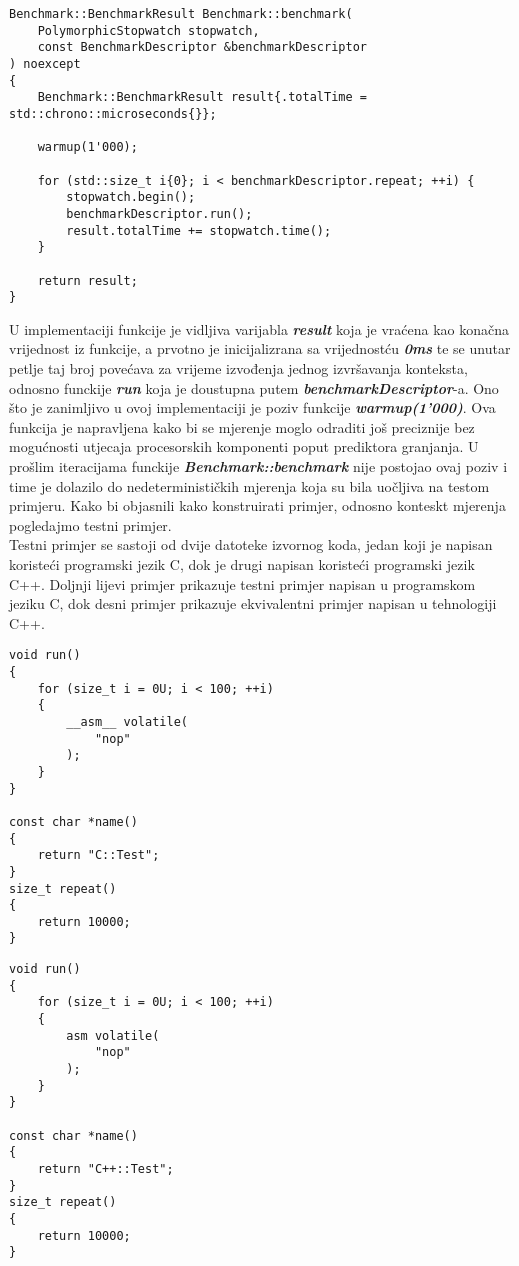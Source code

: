 \lstset{language=C++, tabsize=2, frame=single, breaklines=true, showstringspaces=false}
\begin{lstlisting}
Benchmark::BenchmarkResult Benchmark::benchmark(
    PolymorphicStopwatch stopwatch, 
    const BenchmarkDescriptor &benchmarkDescriptor
) noexcept 
{
    Benchmark::BenchmarkResult result{.totalTime = std::chrono::microseconds{}};

    warmup(1'000);

    for (std::size_t i{0}; i < benchmarkDescriptor.repeat; ++i) {
        stopwatch.begin();
        benchmarkDescriptor.run();
        result.totalTime += stopwatch.time();
    }

    return result;
}
\end{lstlisting}
U implementaciji funkcije je vidljiva varijabla \textbf{\textit{result}} koja je vraćena kao konačna vrijednost iz funkcije, a prvotno je inicijalizrana sa vrijednostću \textbf{\textit{0ms}} te se unutar petlje taj broj povećava za vrijeme izvođenja jednog izvršavanja konteksta, odnosno funckije \textbf{\textit{run}} koja je doustupna putem \textbf{\textit{benchmarkDescriptor}}-a. Ono što je zanimljivo u ovoj implementaciji je poziv funkcije \textbf{\textit{warmup(1'000)}}. Ova funkcija je napravljena kako bi se mjerenje moglo odraditi još preciznije bez mogućnosti utjecaja procesorskih komponenti poput prediktora granjanja. U prošlim iteracijama funckije \textbf{\textit{Benchmark::benchmark}} nije postojao ovaj poziv i time je dolazilo do nedeterminističkih mjerenja koja su bila uočljiva na testom primjeru. Kako bi objasnili kako konstruirati primjer, odnosno konteskt mjerenja pogledajmo testni primjer.\\
Testni primjer se sastoji od dvije datoteke izvornog koda, jedan koji je napisan koristeći programski jezik C, dok je drugi napisan koristeći programski jezik C++. Doljnji lijevi primjer prikazuje testni primjer napisan u programskom jeziku C, dok desni primjer prikazuje ekvivalentni primjer napisan u tehnologiji C++.
\pagebreak
\begin{multicols}{2}
\lstset{language=C, tabsize=2, frame=single, breaklines=true, showstringspaces=false, basicstyle=\small}
\begin{lstlisting}    
void run()
{
    for (size_t i = 0U; i < 100; ++i)
    {
        __asm__ volatile(
            "nop"
        );
    }
}

const char *name() 
{ 
    return "C::Test"; 
}
size_t repeat() 
{ 
    return 10000; 
}      
\end{lstlisting}
\columnbreak
\lstset{language=C++, tabsize=2, frame=single, breaklines=true, showstringspaces=false, basicstyle=\small}
\begin{lstlisting}    
void run()
{
    for (size_t i = 0U; i < 100; ++i)
    {
        asm volatile(
            "nop"
        );
    }
}

const char *name() 
{
    return "C++::Test"; 
}
size_t repeat() 
{ 
    return 10000; 
}      
\end{lstlisting}
\end{multicols}
